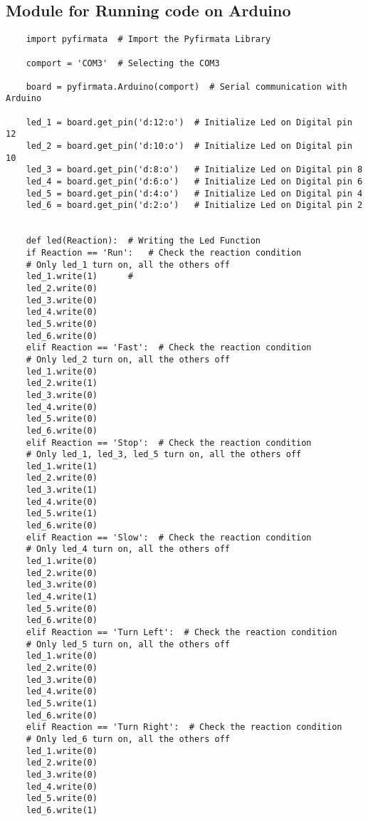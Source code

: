 \subsection{Module for Running code on Arduino}
\begin{verbatim}
	import pyfirmata  # Import the Pyfirmata Library
	
	comport = 'COM3'  # Selecting the COM3
	
	board = pyfirmata.Arduino(comport)  # Serial communication with Arduino
	
	led_1 = board.get_pin('d:12:o')  # Initialize Led on Digital pin 12
	led_2 = board.get_pin('d:10:o')  # Initialize Led on Digital pin 10
	led_3 = board.get_pin('d:8:o')   # Initialize Led on Digital pin 8
	led_4 = board.get_pin('d:6:o')   # Initialize Led on Digital pin 6
	led_5 = board.get_pin('d:4:o')   # Initialize Led on Digital pin 4
	led_6 = board.get_pin('d:2:o')   # Initialize Led on Digital pin 2
	
	
	def led(Reaction):  # Writing the Led Function
	if Reaction == 'Run':   # Check the reaction condition
	# Only led_1 turn on, all the others off
	led_1.write(1)      #
	led_2.write(0)
	led_3.write(0)
	led_4.write(0)
	led_5.write(0)
	led_6.write(0)
	elif Reaction == 'Fast':  # Check the reaction condition
	# Only led_2 turn on, all the others off
	led_1.write(0)
	led_2.write(1)
	led_3.write(0)
	led_4.write(0)
	led_5.write(0)
	led_6.write(0)
	elif Reaction == 'Stop':  # Check the reaction condition
	# Only led_1, led_3, led_5 turn on, all the others off
	led_1.write(1)
	led_2.write(0)
	led_3.write(1)
	led_4.write(0)
	led_5.write(1)
	led_6.write(0)
	elif Reaction == 'Slow':  # Check the reaction condition
	# Only led_4 turn on, all the others off
	led_1.write(0)
	led_2.write(0)
	led_3.write(0)
	led_4.write(1)
	led_5.write(0)
	led_6.write(0)
	elif Reaction == 'Turn Left':  # Check the reaction condition
	# Only led_5 turn on, all the others off
	led_1.write(0)
	led_2.write(0)
	led_3.write(0)
	led_4.write(0)
	led_5.write(1)
	led_6.write(0)
	elif Reaction == 'Turn Right':  # Check the reaction condition
	# Only led_6 turn on, all the others off
	led_1.write(0)
	led_2.write(0)
	led_3.write(0)
	led_4.write(0)
	led_5.write(0)
	led_6.write(1)
	
\end{verbatim}
